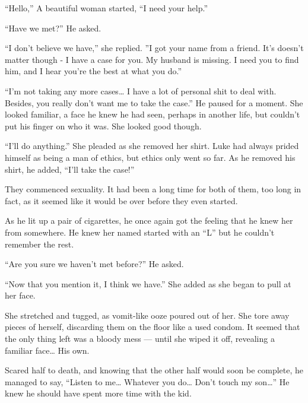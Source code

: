 ``Hello,'' A beautiful woman started, ``I need your
help.''



``Have we met?'' He asked.



``I don't believe we have,'' she replied. ''I
got your name from a friend. It's doesn't matter though
- I have a case for you. My husband is missing. I need you to find
him, and I hear you're the best at what you do.''



``I'm not taking any more cases{\ldots} I have a lot of
personal shit to deal with. Besides, you really don't want me
to take the case.'' He paused for a moment. She looked
familiar, a face he knew he had seen, perhaps in another life, but
couldn't put his finger on who it was. She looked good
though.



``I'll do anything.'' She pleaded as she removed
her shirt. Luke had always prided himself as being a man of ethics,
but ethics only went so far. As he removed his shirt, he added,
``I'll take the case!''



They commenced sexuality. It had been a long time for both of them,
too long in fact, as it seemed like it would be over before they
even started.



As he lit up a pair of cigarettes, he once again got the feeling
that he knew her from somewhere. He knew her named started with an
``L'' but he couldn't remember the rest.



``Are you sure we haven't met before?'' He
asked.



``Now that you mention it, I think we have.'' She added
as she began to pull at her face.



She stretched and tugged, as vomit-like ooze poured out of her. She
tore away pieces of herself, discarding them on the floor like a
used condom. It seemed that the only thing left was a bloody mess
--- until she wiped it off, revealing a familiar face{\ldots}
His own.



Scared half to death, and knowing that the other half would soon be
complete, he managed to say, ``Listen to me{\ldots} Whatever
you do{\ldots} Don't touch my son{\ldots}'' He knew he
should have spent more time with the kid.



